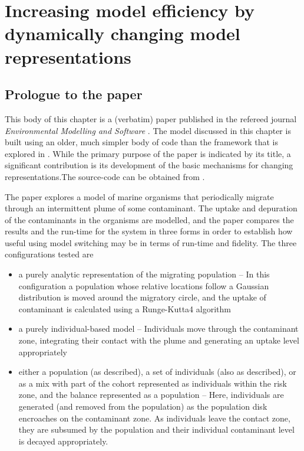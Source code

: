 \chapter[INCREASING MODEL EFFICIENCY BY DYNAMICALLY CHANGING MODEL
  REPRESENTATIONS]{ Increasing model efficiency by dynamically
  changing model representations}\label{modelefficiency}

\WeAreOn{\ctwo}
\section{Prologue to the paper}
This body of this chapter is a (verbatim) paper published in the
refereed journal \emph{Environmental Modelling and Software\/}
\citep{gray2012adaptive}.  The model discussed in this chapter is
built using an older, much simpler body of code than the framework
that is explored in \Cthree. While the primary
purpose of the paper is indicated by its title, a significant
contribution is its development of the basic mechanisms for
changing representations.The source-code can be
obtained from\linebreak
{}.

The paper explores a model of marine organisms that periodically
migrate through an intermittent plume of some contaminant.  The uptake
and depuration of the contaminants in the organisms are modelled, and
the paper compares the results and the run-time for the system in three
forms in order to establish how useful using model switching may be in
terms of run-time and fidelity.  The three configurations tested are
\begin{itemize}
\item a purely analytic representation of the
  migrating population -- In this configuration a population whose
  relative locations follow a Gaussian distribution is moved around the
  migratory circle, and the uptake of contaminant is calculated using
  a Runge-Kutta4 algorithm
\item a purely individual-based model -- Individuals move through the
  contaminant zone, integrating their contact with the plume and
  generating an uptake level appropriately
\item either a population (as described), a set of individuals (also
  as described), or as a mix with part of the cohort represented as
  individuals within the risk zone, and the balance represented as a
  population -- Here, individuals are generated (and removed from the
  population) as the population disk encroaches on the contaminant
  zone. As individuals leave the contact zone, they are subsumed by
  the population and their individual contaminant level is decayed
  appropriately.
\end{itemize}

